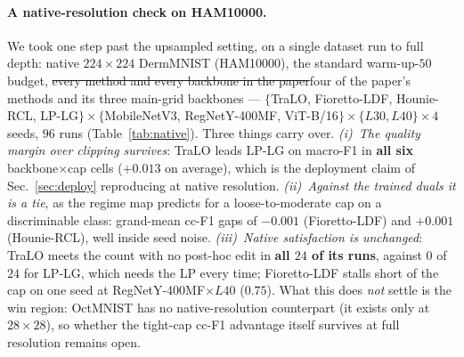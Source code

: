 \documentclass[10pt]{article}
\newcommand{\del}[1]{{\color{red}\sout{#1}}}
\begin{document}
{\color{blue}
\paragraph{A native-resolution check on HAM10000.}
We took one step past the upsampled setting, on a single dataset run to full depth:
native $224{\times}224$ DermMNIST (HAM10000), the standard warm-up-$50$ budget,
\del{every method and every backbone in the paper}{\color{blue}four of the paper's
methods and its three main-grid backbones} --- $\{$TraLO, Fioretto-LDF, Hounie-RCL, LP-LG$\}
\times \{$MobileNetV3, RegNetY-400MF, ViT-B/16$\} \times \{L30, L40\} \times 4$ seeds,
$96$ runs (Table~\ref{tab:native}). Three things carry over. \emph{(i)~The quality margin
over clipping survives}: TraLO leads LP-LG on macro-F1 in \textbf{all six}
backbone$\times$cap cells ($+0.013$ on average), which is the deployment claim of
Sec.~\ref{sec:deploy} reproducing at native resolution. \emph{(ii)~Against the trained
duals it is a tie}, as the regime map predicts for a loose-to-moderate cap on a
discriminable class: grand-mean cc-F1 gaps of $-0.001$ (Fioretto-LDF) and $+0.001$
(Hounie-RCL), well inside seed noise. \emph{(iii)~Native satisfaction is unchanged}:
TraLO meets the count with no post-hoc edit in \textbf{all $24$ of its runs}, against
$0$ of $24$ for LP-LG, which needs the LP every time; Fioretto-LDF stalls short of the
cap on one seed at RegNetY-400MF$\times L40$ ($0.75$). What this does \emph{not} settle
is the win region: OctMNIST has no native-resolution counterpart (it exists only at
$28{\times}28$), so whether the tight-cap cc-F1 advantage itself survives at full
resolution remains open.}
\end{document}
